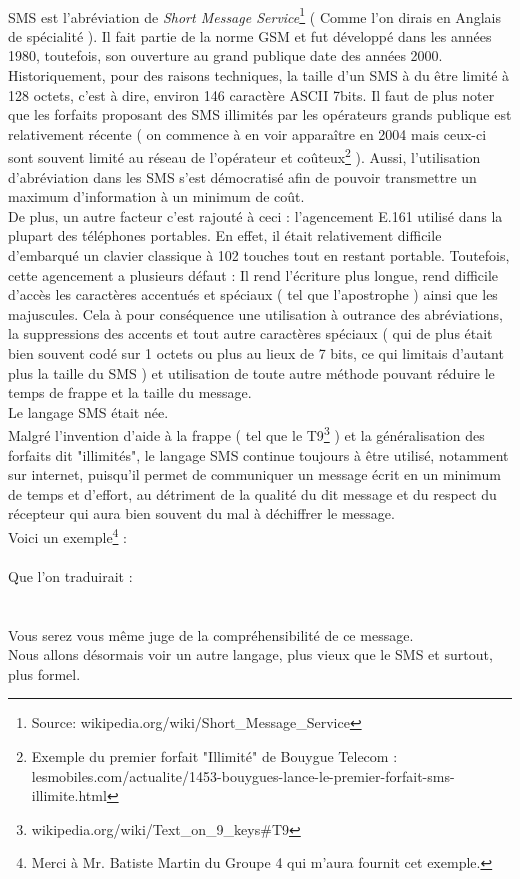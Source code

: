 \documentclass[11pt]{book}
\begin{document}
	\paragraph{}
	SMS est l'abréviation de {\em Short Message Service}\footnote{Source: wikipedia.org/wiki/Short\_Message\_Service} ( Comme l'on dirais en Anglais de spécialité ). Il fait partie de la norme GSM et fut développé dans les années 1980, toutefois, son ouverture au grand publique date des années 2000. Historiquement, pour des raisons techniques, la taille d'un SMS à du être limité à 128 octets, c'est à dire, environ 146 caractère ASCII 7bits. Il faut de plus noter que les forfaits proposant des SMS illimités par les opérateurs grands publique est relativement récente ( on commence à en voir apparaître en 2004 mais ceux-ci sont souvent limité au réseau de l'opérateur et coûteux\footnote{Exemple du premier forfait "Illimité" de Bouygue Telecom : lesmobiles.com/actualite/1453-bouygues-lance-le-premier-forfait-sms-illimite.html} ). Aussi, l'utilisation d'abréviation dans les SMS s'est démocratisé afin de pouvoir transmettre un maximum d'information à un minimum de coût.\\
	De plus, un autre facteur c'est rajouté à ceci : l'agencement E.161 utilisé dans la plupart des téléphones portables. En effet, il était relativement difficile d'embarqué un clavier classique à 102 touches tout en restant portable. Toutefois, cette agencement a plusieurs défaut : Il rend l'écriture plus longue, rend difficile d'accès les caractères accentués et spéciaux ( tel que l'apostrophe ) ainsi que les majuscules. Cela à pour conséquence une utilisation à outrance des abréviations, la suppressions des accents et tout autre caractères spéciaux ( qui de plus était bien souvent codé sur 1 octets ou plus au lieux de 7 bits, ce qui limitais d'autant plus la taille du SMS ) et utilisation de toute autre méthode pouvant réduire le temps de frappe et la taille du message.\\
	Le langage SMS était née.\\
	Malgré l'invention d'aide à la frappe ( tel que le T9\footnote{wikipedia.org/wiki/Text\_on\_9\_keys\#T9} ) et la généralisation des forfaits dit "illimités", le langage SMS continue toujours à être utilisé, notamment sur internet, puisqu'il permet de communiquer un message écrit en un minimum de temps et d'effort, au détriment de la qualité du dit message et du respect du récepteur qui aura bien souvent du mal à déchiffrer le message.\\
	Voici un exemple\footnote{Merci à Mr. Batiste Martin du Groupe 4 qui m'aura fournit cet exemple.} : \\
	\\
	Que l'on traduirait :\\
	\\\\
	Vous serez vous même juge de la compréhensibilité de ce message.\\
	Nous allons désormais voir un autre langage, plus vieux que le SMS et surtout, plus formel.
	
\end{document}

